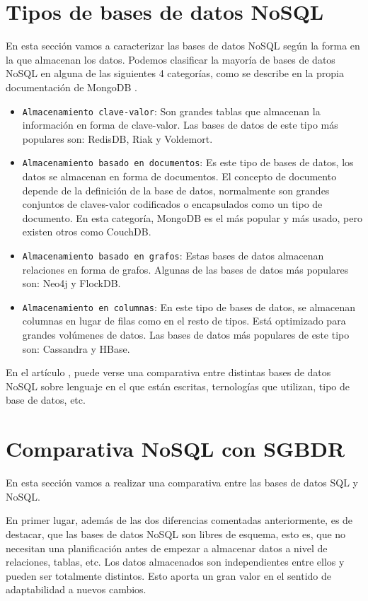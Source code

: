 \section{Tipos de bases de datos NoSQL}

En esta sección vamos a caracterizar las bases de datos NoSQL según la forma en la que almacenan los datos. Podemos clasificar la mayoría de bases de datos NoSQL en alguna de las siguientes 4 categorías, como se describe en la propia documentación de MongoDB \cite{mongoclassification}.

\begin{itemize}
    \item \texttt{Almacenamiento clave-valor}: Son grandes tablas que almacenan la información en forma de clave-valor. Las bases de datos de este tipo más populares son: RedisDB, Riak y Voldemort.
    \item \texttt{Almacenamiento basado en documentos}: Es este tipo de bases de datos, los datos se almacenan en forma de documentos. El concepto de documento depende de la definición de la base de datos, normalmente son grandes conjuntos de claves-valor codificados o encapsulados como un tipo de documento. En esta categoría, MongoDB es el más popular y más usado, pero existen otros como CouchDB.
    \item \texttt{Almacenamiento basado en grafos}: Estas bases de datos almacenan relaciones en forma de grafos. Algunas de las bases de datos más populares son: Neo4j y FlockDB.
    \item \texttt{Almacenamiento en columnas}: En este tipo de bases de datos, se almacenan columnas en lugar de filas como en el resto de tipos. Está optimizado para grandes volúmenes de datos. Las bases de datos más populares de este tipo son: Cassandra y HBase. 
\end{itemize}

En el artículo \cite{nosqlcomparativas}, puede verse una comparativa entre distintas bases de datos NoSQL sobre lenguaje en el que están escritas, ternologías que utilizan, tipo de base de datos, etc.

\section{Comparativa NoSQL con SGBDR}

En esta sección vamos a realizar una comparativa entre las bases de datos SQL y NoSQL.

En primer lugar, además de las dos diferencias comentadas anteriormente, es de destacar, que las bases de datos NoSQL son libres de esquema, esto es, que no necesitan una planificación antes de empezar a almacenar datos a nivel de relaciones, tablas, etc. Los datos almacenados son independientes entre ellos y pueden ser totalmente distintos. Esto aporta un gran valor en el sentido de adaptabilidad a nuevos cambios.

